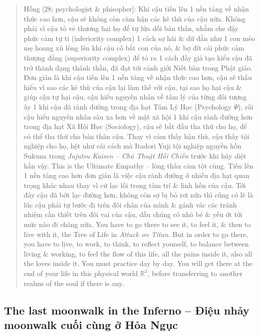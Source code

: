 \documentclass[12pt]{article}
\begin{document}
\begin{quote}
	{\sf Hồng [28; psychologist \& phisopher]}: Khi cậu tiến lên 1 nền tảng về nhận thức cao hơn, cậu sẽ không còn căm hận các kẻ thù của cậu nữa. Không phải vì cậu tỏ vẻ thương hại họ để tự lừa dối bản thân, nhằm che đậy phức cảm tự ti (inferiority complex) 1 cách sợ hãi \& dữ dằn như 1 con mèo mẹ hoang xù lông lên khi cậu cố bắt con của nó, \& bợ đít cái phức cảm thượng đẳng (superiority complex) để tỏ ra 1 cách đầy giả tạo kiểu cậu đã trở thành dạng thánh thần, đã đạt tới cảnh giới Niết bàn trong Phật giáo. Đơn giản là khi cậu tiến lên 1 nền tảng về nhận thức cao hơn, cậu sẽ thấu hiểu vì sao các kẻ thù của cậu lại làm thế với cậu, tại sao họ hại cậu \& giúp cậu tự hại cậu, cậu hiểu nguyên nhân về tâm lý của từng đối tượng ấy 1 khi cậu đã rành đường trong địa hạt Tâm Lý Học (Psychology $\Psi$), rồi cậu hiểu nguyên nhân sâu xa hơn về mặt xã hội 1 khi cậu rành đường hơn trong địa hạt Xã Hội Học (Sociology), cậu sẽ bắt đầu tha thứ cho họ, để có thể tha thứ cho bản thân cậu. Thay vì cảm thấy hận thù, cậu thấy tội nghiệp cho họ, hệt như cái cách mà Itadori Yuji tội nghiệp nguyền hồn Sukuna trong {\it Jujutsu Kaisen -- Chú Thuật Hồi Chiến} trước khi hủy diệt hắn vậy. This is the Ultimate Empathy -- lòng thấu cảm tột cùng. Tiến lên 1 nền tảng cao hơn đơn giản là việc cậu rành đường ở nhiều địa hạt quan trọng khác nhau thay vì cứ lạc lối trong tâm trí \& linh hồn của cậu. Tới đây cậu đã bớt lạc đường hơn, không còn sợ bị bỏ rơi nữa thì cũng có lẽ là lúc cậu phải tự bước đi trên đôi chân của mình \& gánh vác các tránh nhiệm cần thiết trên đôi vai của cậu, dẫu chúng có nhỏ bé \& yếu ớt tới mức nào đi chăng nữa. You have to go there to see it, to feel it, \& then to live with it, the Tree of Life in {\it Attack on Titan}. But in order to go there, you have to live, to work, to think, to reflect yourself, to balance between living \& working, to feel the flow of this life, all the pains inside it, also all the loves inside it. You must practice day by day. You will get there at the end of your life in this physical world $\mathbb{R}^3$, before transferring to another realms of the soul if there is any.
\end{quote}

\subsection{The last moonwalk in the Inferno -- Điệu nhảy moonwalk cuối cùng ở Hỏa Ngục}
\end{document}
